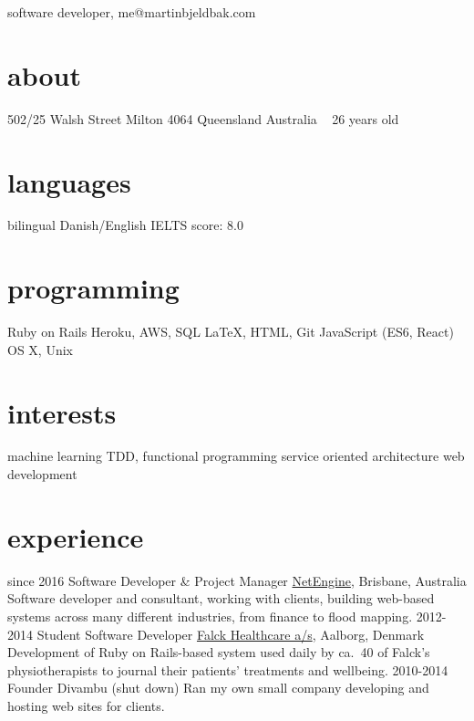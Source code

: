 \documentclass{afriggeri-cv/friggeri-cv}
\begin{document}
{software developer, me@martinbjeldbak.com}

\begin{aside}
  \section{about}
    502/25 Walsh Street
    Milton 4064
    Queensland
    Australia
    ~
    26 years old
  \section{languages}
    bilingual Danish/English
    IELTS score: 8.0
  \section{programming}
    Ruby on Rails
    Heroku, AWS, SQL
    \LaTeX, HTML, Git
    JavaScript (ES6, React)
    OS X, Unix
  \section{interests}
    machine learning
    TDD, functional programming
    service oriented architecture
    web development
\end{aside}

\section{experience}

\begin{entrylist}
  \entry%
    {since 2016}
    {Software Developer \& Project Manager}
    {\href{http://netengine.com.au/}{NetEngine}, Brisbane, Australia}
    {Software developer and consultant, working with clients, building web-based systems across many
    different industries, from finance to flood mapping.}
  \entry%
    {2012-2014}
    {Student Software Developer}
    {\href{http://www.falck.com/en/company/organisation/business-areas/healthcare}{Falck Healthcare a/s}, Aalborg, Denmark}
    {Development of Ruby on Rails-based system used daily by ca.\ 40 of Falck's physiotherapists to journal their patients' treatments and wellbeing.}
  \entry
    {2010-2014}
    {Founder}
    {Divambu (shut down)}
    {Ran my own small company developing and hosting web sites for clients.}
\end{entrylist}
\end{document}
